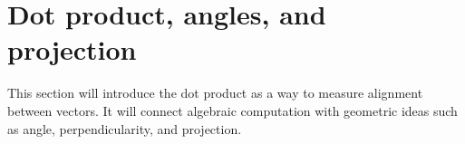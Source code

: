 \section{Dot product, angles, and projection}

This section will introduce the dot product as a way to measure alignment between vectors. It will connect algebraic computation with geometric ideas such as angle, perpendicularity, and projection.

